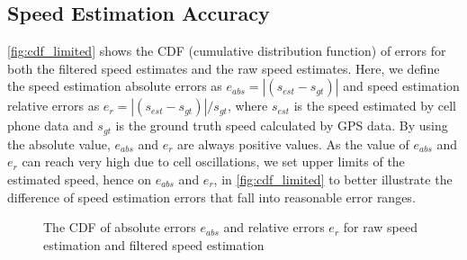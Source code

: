 \subsection{Speed Estimation Accuracy}

\autoref{fig:cdf_limited} shows the CDF (cumulative distribution function) of errors for both the filtered speed estimates and the raw speed estimates. Here, we define the speed estimation absolute errors as $e_{abs} = |(s_{est} - s_{gt})|$ and speed estimation relative errors as $e_r = |(s_{est} - s_{gt})| / s_{gt}$, where $s_{est}$ is the speed estimated by cell phone data and $s_{gt}$ is the ground truth speed calculated by GPS data. By using the absolute value, $e_{abs}$ and $e_r$ are always positive values. As the value of $e_{abs}$ and $e_r$ can reach very high due to cell oscillations, we set upper limits of the estimated speed, hence on $e_{abs}$ and $e_r$, in \autoref{fig:cdf_limited} to better illustrate the difference of speed estimation errors that fall into reasonable error ranges.


\begin{figure}[h]
\centering
{}
\caption{The CDF of absolute errors $e_{abs}$ and relative errors $e_r$ for raw speed estimation and filtered speed estimation}
\label{fig:cdf_e}
\end{figure}

